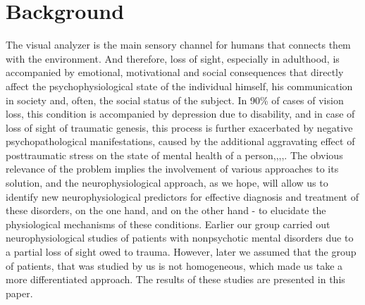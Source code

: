 \documentclass[twocolumn]{article}
\begin{document}
\section{Background}
\par The visual analyzer is the main sensory channel for humans that connects them with the environment. And therefore, loss of sight, especially in adulthood, is accompanied by emotional, motivational and social consequences that directly affect the psychophysiological state of the individual himself, his communication in society and, often, the social status of the subject\cite{bib1}. In 90\% of cases of vision loss, this condition is accompanied by depression due to disability\cite{bib2}, and in case of loss of sight of traumatic genesis, this process is further exacerbated by negative psychopathological manifestations, caused by the additional aggravating effect of posttraumatic stress on the state of mental health of a person\cite{bib3},\cite{bib4},\cite{bib5},\cite{bib6},\cite{bib7}. The obvious relevance of the problem implies the involvement of various approaches to its solution, and the neurophysiological approach, as we hope, will allow us to identify new neurophysiological predictors for effective diagnosis and treatment of these disorders, on the one hand, and on the other hand - to elucidate the physiological mechanisms of these conditions. Earlier our group carried out neurophysiological studies of patients with nonpsychotic mental disorders due to a partial loss of sight owed to trauma\cite{bib8}. However, later we assumed that the group of patients, that was studied by us is not homogeneous, which made us take a more differentiated approach. The results of these studies are presented in this paper.
\end{document}
